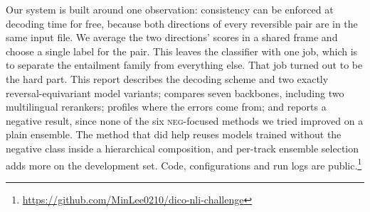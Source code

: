\documentclass[conference]{IEEEtran}
\newcommand{\NEG}{\textsc{neg}}
\begin{document}
Our system is built around one observation: consistency can be enforced at
decoding time for free, because both directions of every reversible pair are
in the same input file. We average the two directions' scores in a shared
frame and choose a single label for the pair. This leaves the classifier with
one job, which is to separate the entailment family from everything else.
That job turned out to be the hard part. This report describes the decoding
scheme and two exactly reversal-equivariant model variants; compares seven
backbones, including two multilingual rerankers; profiles where the errors come
from; and reports a negative result, since none of the six \NEG-focused
methods we tried improved on a plain ensemble. The method that did help reuses
models trained without the negative class inside a hierarchical composition,
and per-track ensemble selection adds more on the development set. Code, configurations and run logs are
public.\footnote{\url{https://github.com/MinLee0210/dico-nli-challenge}}
\end{document}

